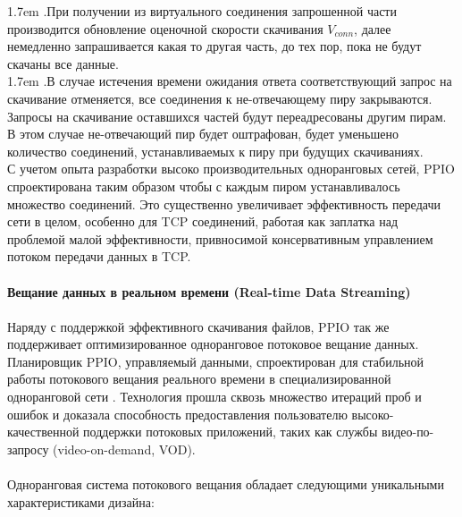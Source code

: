 \documentclass[10pt,a4paper]{article}
\begin{document}
\hangindent 1.7em
.\quad При получении из виртуального соединения запрошенной части производится обновление оценочной скорости скачивания $V_{conn}$, далее немедленно запрашивается какая то другая часть, до тех пор, пока не будут скачаны все данные.
\vspace{-0.8em}
\\ 

\hangindent 1.7em
.\quad В случае истечения времени ожидания ответа соответствующий запрос на скачивание отменяется, все соединения к не-отвечающему пиру закрываются. Запросы на скачивание оставшихся частей будут переадресованы другим пирам. В этом случае не-отвечающий пир будет оштрафован, будет уменьшено количество соединений, устанавливаемых к пиру при будущих скачиваниях.
\vspace{-0.5em}
\\ 

\noindent   
С учетом опыта разработки высоко производительных одноранговых сетей, PPIO спроектирована таким образом чтобы с каждым пиром устанавливалось множество соединений. Это существенно увеличивает эффективность передачи сети в целом, особенно для TCP соединений, работая как заплатка над проблемой малой эффективности, привносимой консервативным управлением потоком передачи данных в TCP.
\vspace{-0.5em}
\\ \\ {\bf Вещание данных в реальном времени (Real-time Data Streaming)}
\vspace{-0.5em}
\\ \\Наряду с поддержкой эффективного скачивания файлов, PPIO так же поддерживает оптимизированное одноранговое потоковое вещание данных. Планировщик PPIO, управляемый данными, спроектирован для стабильной работы потокового вещания реального времени в специализированной одноранговой сети \cite{article12}. Технология прошла сквозь множество итераций проб и ошибок и доказала способность предоставления пользователю высоко-качественной поддержки потоковых приложений, таких как службы видео-по-запросу (video-on-demand, VOD).
\vspace{-0.5em}
\\ \\Одноранговая система потокового вещания обладает следующими уникальными характеристиками дизайна:
\vspace{-0.8em}
\\
\end{document}
